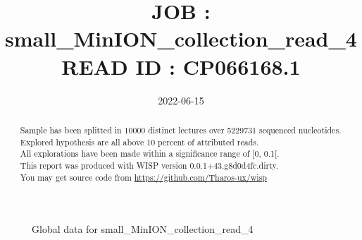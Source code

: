 \documentclass[12pt]{article}
\title{JOB : small\_MinION\_collection\_read\_4\\[0.2em]\smaller{}READ ID : CP066168.1}
\date{2022-06-15}
\begin{document}
\maketitle
\begin{abstract}
\begin{sloppypar}
Sample has been splitted in 10000 distinct lectures over 5229731 sequenced nucleotides.\\
Explored hypothesis are all above 10 percent of attributed reads.\\
All explorations have been made within a significance range of [0, 0.1[.\\
This report was produced with WISP version 0.0.1+43.g8d0d4fc.dirty. \\
You may get source code from \url{https://github.com/Tharos-ux/wisp}
\end{sloppypar}
\end{abstract}\begin{figure}[h]
\centering


\caption{Global data for small\_MinION\_collection\_read\_4}
\label{f-Global data for small\_MinION\_collection\_read\_4}
\end{figure}
\end{document}
